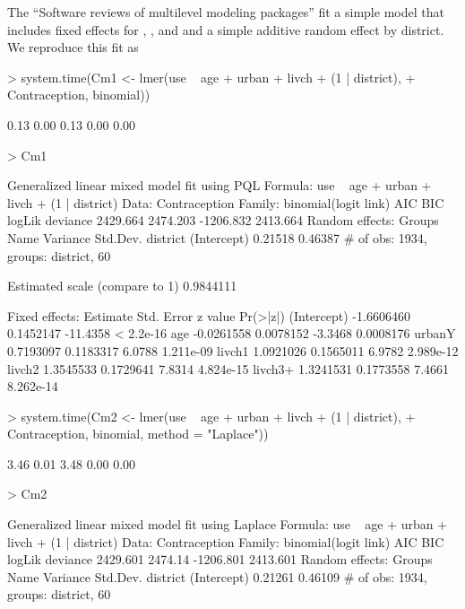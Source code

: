 \documentclass[12pt]{article}
\begin{document}
The ``Software reviews of multilevel modeling packages'' fit a simple
model that includes fixed effects for , , and
 and a simple additive random effect by district.  We
reproduce this fit as
\begin{Schunk}
\begin{Sinput}
> system.time(Cm1 <- lmer(use ~ age + urban + livch + (1 | district), 
+     Contraception, binomial))
\end{Sinput}
\begin{Soutput}
[1] 0.13 0.00 0.13 0.00 0.00
\end{Soutput}
\begin{Sinput}
> Cm1
\end{Sinput}
\begin{Soutput}
Generalized linear mixed model fit using PQL 
Formula: use ~ age + urban + livch + (1 | district) 
   Data: Contraception 
 Family: binomial(logit link)
      AIC      BIC    logLik deviance
 2429.664 2474.203 -1206.832 2413.664
Random effects:
     Groups        Name    Variance    Std.Dev. 
   district (Intercept)     0.21518     0.46387 
# of obs: 1934, groups: district, 60

Estimated scale (compare to 1)  0.9844111 

Fixed effects:
              Estimate Std. Error  z value  Pr(>|z|)
(Intercept) -1.6606460  0.1452147 -11.4358 < 2.2e-16
age         -0.0261558  0.0078152  -3.3468 0.0008176
urbanY       0.7193097  0.1183317   6.0788 1.211e-09
livch1       1.0921026  0.1565011   6.9782 2.989e-12
livch2       1.3545533  0.1729641   7.8314 4.824e-15
livch3+      1.3241531  0.1773558   7.4661 8.262e-14
\end{Soutput}
\begin{Sinput}
> system.time(Cm2 <- lmer(use ~ age + urban + livch + (1 | district), 
+     Contraception, binomial, method = "Laplace"))
\end{Sinput}
\begin{Soutput}
[1] 3.46 0.01 3.48 0.00 0.00
\end{Soutput}
\begin{Sinput}
> Cm2
\end{Sinput}
\begin{Soutput}
Generalized linear mixed model fit using Laplace 
Formula: use ~ age + urban + livch + (1 | district) 
   Data: Contraception 
 Family: binomial(logit link)
      AIC     BIC    logLik deviance
 2429.601 2474.14 -1206.801 2413.601
Random effects:
     Groups        Name    Variance    Std.Dev. 
   district (Intercept)     0.21261     0.46109 
# of obs: 1934, groups: district, 60


\end{Soutput}
\end{Schunk}
\end{document}
